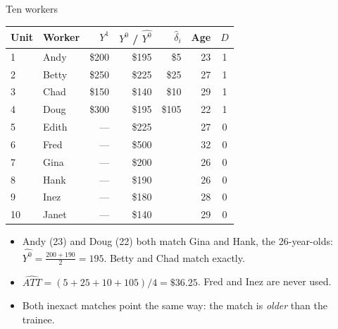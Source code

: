 \documentclass[
  11pt,
  ignorenonframetext,
  aspectratio=169,
]{beamer}
\providecommand{\tightlist}{%
  \setlength{\itemsep}{0pt}\setlength{\parskip}{0pt}}
\begin{document}
\begin{frame}{Ten workers}
\protect{}\label{ten-workers}
\small
\begin{center}
\begin{tabular}{llrrrrc}
\toprule
Unit & Worker & $Y^1$ & $Y^0$ / $\widehat{Y^0}$ & $\hat\delta_i$ & Age & $D$ \\
\midrule
1 & Andy  & \$200 & \$195 & \$5   & 23 & 1 \\
2 & Betty & \$250 & \$225 & \$25  & 27 & 1 \\
3 & Chad  & \$150 & \$140 & \$10  & 29 & 1 \\
4 & Doug  & \$300 & \$195 & \$105 & 22 & 1 \\
\midrule
5 & Edith & --- & \$225 & & 27 & 0 \\
6 & Fred  & --- & \$500 & & 32 & 0 \\
7 & Gina  & --- & \$200 & & 26 & 0 \\
8 & Hank  & --- & \$190 & & 26 & 0 \\
9 & Inez  & --- & \$180 & & 28 & 0 \\
10 & Janet & --- & \$140 & & 29 & 0 \\
\bottomrule
\end{tabular}
\end{center}
\normalsize

\begin{itemize}
\tightlist
\item
  Andy (23) and Doug (22) both match Gina and Hank, the 26-year-olds:
  \(\widehat{Y^0} = \tfrac{200+190}{2} = 195\). Betty and Chad match
  exactly.
\item
  \(\widehat{ATT} = (5 + 25 + 10 + 105)/4 = \$36.25\). Fred and Inez are
  never used.
\item
  Both inexact matches point the same way: the match is \emph{older}
  than the trainee.
\end{itemize}
\end{frame}
\end{document}
